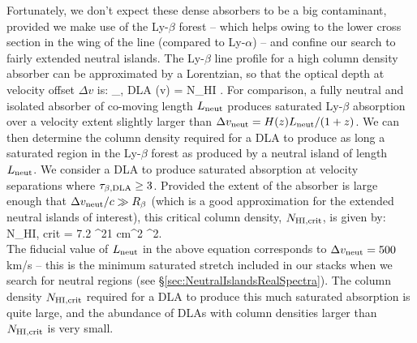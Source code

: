 Fortunately, we don't expect these dense absorbers to be a big contaminant,
provided we make use of the Ly-$\beta$ forest -- which helps owing to
the lower cross section in the wing of the 
line (compared to Ly-$\alpha$) -- and confine our
search to fairly extended neutral islands. The Ly-$\beta$ line profile
for a high column density absorber can be approximated
by a Lorentzian, so that the optical depth at velocity offset $\Delta v$ is:
\beqa
\tau_{\beta, \rm{DLA}} (\Delta v) = N_{\rm HI}  .
\label{eq:taub_dla}
\eeqa
For comparison, a fully neutral and isolated absorber of co-moving length $L_{\rm neut}$ produces saturated Ly-$\beta$ absorption over a
velocity extent slightly larger than $\Delta v_{\rm neut} = H(z) L_{\rm neut}/(1+z)$. We can then
determine the column density required for a DLA to produce as long a saturated region in the Ly-$\beta$ forest as produced
by  a neutral island of
length $L_{\rm neut}$. We consider a DLA to produce saturated absorption at velocity separations where $\tau_{\beta, \rm{DLA}} \geq 3$.
Provided the extent of the absorber is large enough that $\Delta v_{\rm neut}/c \gg R_\beta$ (which
is a good approximation for the extended neutral islands of interest), this 
critical column density, $N_{\rm HI, crit}$, is given by:
\beqa
N_{\rm HI, crit} = 7.2 ^{21} \rm{cm}^2  
^2. \nonumber \\
\label{eq:ncrit}
\eeqa
The fiducial value of $L_{\rm neut}$ in the above equation corresponds to $\Delta v_{\rm neut} = 500$ km/s -- this is
the minimum saturated stretch included in our stacks when we search for neutral regions (see \S \ref{sec:NeutralIslandsRealSpectra}). The 
column density $N_{\rm HI, crit}$ required for a DLA to produce this much saturated absorption is quite large, and
the abundance of DLAs with column densities larger than $N_{\rm HI, crit}$ is very small. 

